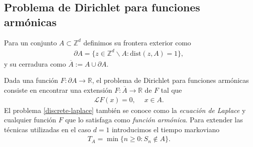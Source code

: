 \documentclass{article}
\numberwithin{equation}{section}
\begin{document}
\subsection{Problema de Dirichlet para funciones armónicas}

Para un conjunto $A \subset \mathbb{Z}^d$ definimos su frontera exterior como
\begin{align*}
    \partial A = \{z \in \mathbb{Z}^d \backslash A : \text{dist}(z,A) = 1\},
\end{align*}
y su cerradura como  $\overline{A} := A\cup \partial  A$.

 Dada una función $F : \partial A \to \mathbb{R}$, el problema de Dirichlet para funciones armónicas consiste en encontrar una extensión $F : \overline{A} \to \mathbb{R}$ de $F$ tal que
\begin{align}\label{discrete-laplace}
    \mathcal{L}F(x) = 0, \quad \: x \in A.
\end{align}
El problema \eqref{discrete-laplace} también se conoce como la \emph{ecuación de Laplace} y cualquier función $F$ que lo satisfaga 
como \emph{función armónica}. Para extender las técnicas utilizadas en el caso $d=1$ introducimos el tiempo markoviano 
\begin{align*}
T_A = \min\{n\geq 0 : S_n \not \in A\}.
\end{align*}
\end{document}
